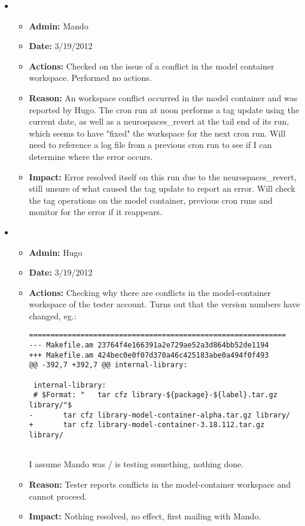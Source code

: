 \documentclass[12pt]{article}
\begin{document}
\begin{itemize}


\item
  \begin{itemize}
  \item[] {\bf Admin:} Mando
  \item[] {\bf Date:} 3/19/2012
  \item[] {\bf Actions:} Checked on the issue of a conflict in the model container workspace. Performed no actions.
  \item[] {\bf Reason:} An workspace conflict occurred in the model container and was reported by Hugo. The cron run at noon performs a tag update using the current date, as well as a neurospaces\_revert at the tail end of its run, which seems to have "fixed" the workspace for the next cron run. Will need to reference a log file from a previous cron run to see if I can determine where the error occurs.
  \item[] {\bf Impact:} Error resolved itself on this run due to the neurospaces\_revert, still unsure of what caused the tag update to report an error. Will check the tag operations on the model container, previous cron runs and monitor for the error if it reappears.
  \end{itemize}
  

\item
  \begin{itemize}
  \item[] {\bf Admin:} Hugo
  \item[] {\bf Date:} 3/19/2012
  \item[] {\bf Actions:} Checking why there are conflicts in the model-container workspace of the tester account.  Turns out that the version numbers have changed, eg.:
\begin{verbatim}
============================================================
--- Makefile.am 23764f4e166391a2e729ae52a3d864bb52de1194
+++ Makefile.am 424bec0e0f07d370a46c425183abe0a494f0f493
@@ -392,7 +392,7 @@ internal-library:
 
 internal-library:
 # $Format: "   tar cfz library-${package}-${label}.tar.gz library/"$
-       tar cfz library-model-container-alpha.tar.gz library/
+       tar cfz library-model-container-3.18.112.tar.gz library/
 
\end{verbatim}
    I assume Mando was / is testing something, nothing done.
  \item[] {\bf Reason:} Tester reports conflicts in the model-container workspace and cannot proceed.
  \item[] {\bf Impact:} Nothing resolved, no effect, first mailing
    with Mando.
  \end{itemize}


\end{itemize}
\end{document}

